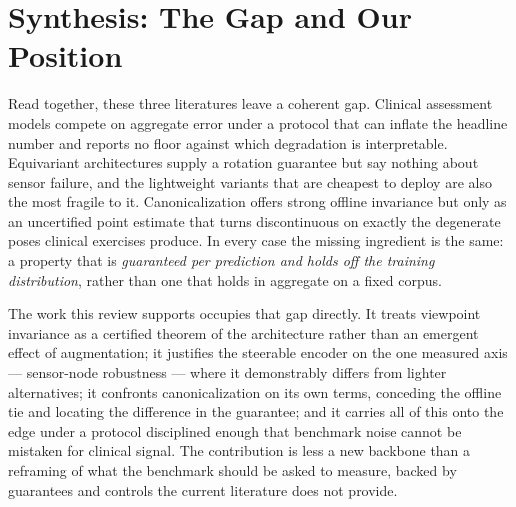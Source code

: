 \documentclass[11pt]{article}
\begin{document}
\section{Synthesis: The Gap and Our Position}
Read together, these three literatures leave a coherent gap. Clinical assessment models compete on
aggregate error under a protocol that can inflate the headline number and reports no floor against which
degradation is interpretable. Equivariant architectures supply a rotation guarantee but say nothing about
sensor failure, and the lightweight variants that are cheapest to deploy are also the most fragile to it.
Canonicalization offers strong offline invariance but only as an uncertified point estimate that turns
discontinuous on exactly the degenerate poses clinical exercises produce. In every case the missing
ingredient is the same: a property that is \emph{guaranteed per prediction and holds off the training
distribution}, rather than one that holds in aggregate on a fixed corpus.

The work this review supports occupies that gap directly. It treats viewpoint invariance as a certified
theorem of the architecture rather than an emergent effect of augmentation; it justifies the steerable
encoder on the one measured axis --- sensor-node robustness --- where it demonstrably differs from lighter
alternatives; it confronts canonicalization on its own terms, conceding the offline tie and locating the
difference in the guarantee; and it carries all of this onto the edge under a protocol disciplined enough
that benchmark noise cannot be mistaken for clinical signal. The contribution is less a new backbone than
a reframing of what the benchmark should be asked to measure, backed by guarantees and controls the
current literature does not provide.
\end{document}

